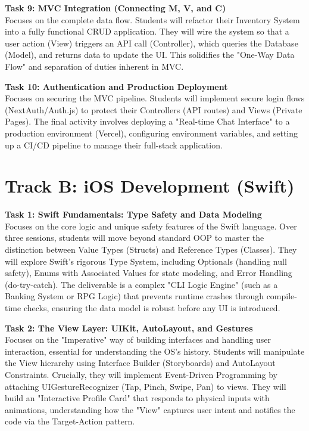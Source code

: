 \vspace{0.3cm}

\noindent\textbf{Task 9: MVC Integration (Connecting M, V, and C)} \\
Focuses on the complete data flow. Students will refactor their Inventory System into a fully functional CRUD application. They will wire the system so that a user action (View) triggers an API call (Controller), which queries the Database (Model), and returns data to update the UI. This solidifies the "One-Way Data Flow" and separation of duties inherent in MVC.

\vspace{0.3cm}

\noindent\textbf{Task 10: Authentication and Production Deployment} \\
Focuses on securing the MVC pipeline. Students will implement secure login flows (NextAuth/Auth.js) to protect their Controllers (API routes) and Views (Private Pages). The final activity involves deploying a "Real-time Chat Interface" to a production environment (Vercel), configuring environment variables, and setting up a CI/CD pipeline to manage their full-stack application.

\newpage

\section*{Track B: iOS Development (Swift)}

\noindent\textbf{Task 1: Swift Fundamentals: Type Safety and Data Modeling} \\
Focuses on the core logic and unique safety features of the Swift language. Over three sessions, students will move beyond standard OOP to master the distinction between Value Types (Structs) and Reference Types (Classes). They will explore Swift’s rigorous Type System, including Optionals (handling null safety), Enums with Associated Values for state modeling, and Error Handling (do-try-catch). The deliverable is a complex "CLI Logic Engine" (such as a Banking System or RPG Logic) that prevents runtime crashes through compile-time checks, ensuring the data model is robust before any UI is introduced.

\vspace{0.3cm}

\noindent\textbf{Task 2: The View Layer: UIKit, AutoLayout, and Gestures} \\
Focuses on the "Imperative" way of building interfaces and handling user interaction, essential for understanding the OS's history. Students will manipulate the View hierarchy using Interface Builder (Storyboards) and AutoLayout Constraints. Crucially, they will implement Event-Driven Programming by attaching UIGestureRecognizer (Tap, Pinch, Swipe, Pan) to views. They will build an "Interactive Profile Card" that responds to physical inputs with animations, understanding how the "View" captures user intent and notifies the code via the Target-Action pattern.

